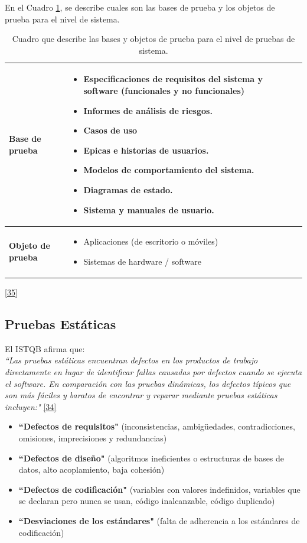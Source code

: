  	En el Cuadro \ref{tbl:basesyobjetos},  se describe cuales son las bases de prueba y los objetos de prueba para el nivel de sistema.
 

\begin{table}[H]
	\centering
	\begin{tabular}{|p{3.5cm}|p{13cm}|}
		\hline
		\centering \textbf{Base de prueba} & \begin{itemize}
			\item Especificaciones de requisitos del sistema y software (funcionales y no funcionales)
			\item Informes de análisis de riesgos.
			\item Casos de uso
			\item Epicas e historias de usuarios.
			\item Modelos de comportamiento del sistema.
			\item Diagramas de estado.
			\item Sistema y manuales de usuario.
		\end{itemize}
		  \\
		\hline
		\centering \textbf{Objeto de prueba} & \begin{itemize}
			\item Aplicaciones (de escritorio o móviles)
			\item Sistemas de hardware / software
		\end{itemize}  \\
		\hline
	\end{tabular}
\caption{Cuadro que describe las bases y objetos de prueba para el nivel de pruebas de sistema.}
\label{tbl:basesyobjetos}
\hyperlink{b35}{[35]}
\end{table}

\newpage

\subsection{Pruebas Estáticas}

El ISTQB afirma que:\\

\textit {``Las pruebas estáticas encuentran defectos en los productos de trabajo directamente en lugar de identificar fallas causadas por defectos cuando se ejecuta el software.  En comparación con las pruebas dinámicas, los defectos típicos que son más fáciles y baratos de encontrar y reparar mediante pruebas estáticas incluyen:"} \hyperlink{b34}{[34]}
\begin{itemize}
	\item \textbf {``Defectos de requisitos"} (inconsistencias, ambigüedades, contradicciones, omisiones, imprecisiones y redundancias)
	\item \textbf {``Defectos de diseño"} (algoritmos ineficientes o estructuras de bases de datos, alto acoplamiento, baja cohesión)
	\item \textbf {``Defectos de codificación"} (variables con valores indefinidos, variables que se declaran pero nunca se usan, código inalcanzable, código duplicado)
	\item \textbf {``Desviaciones de los estándares"} (falta de adherencia a los estándares de codificación)
\end{itemize}

